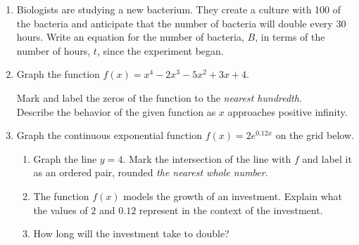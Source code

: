 \documentclass[12pt, twoside]{article}
\begin{document}
\begin{enumerate}[itemsep=0.5cm]
\newpage
\item Biologists are studying a new bacterium. They create a culture with 100 of the bacteria and anticipate that the number of bacteria will double every 30 hours. Write an equation for the number of bacteria, $B$, in terms of the number of hours, $t$, since the experiment began. %
    \vspace{2cm}

\item Graph the function $f(x) = x^4-2x^{3}-5x^{2}+3x+4$. 
\begin{center}
    \end{center}
Mark and label the zeros of the function to the \emph{nearest hundredth}. \\[0.25cm]
Describe the behavior of the given function as $x$ approaches positive infinity.


\newpage
\item Graph the continuous exponential function $f(x) = 2e^{0.12x}$ on the grid below. 
\begin{center}
    \end{center}
    \begin{enumerate}
        \item Graph the line $y=4$. Mark the intersection of the line with $f$ and label it as an ordered pair, rounded \emph{the nearest whole number}.
        \item The function $f(x)$ models the growth of an investment. Explain what the values of $2$ and $0.12$ represent in the context of the investment. \vspace{4cm}
        \item How long will the investment take to double? 
    \end{enumerate}
       
\end{enumerate}
\end{document}
